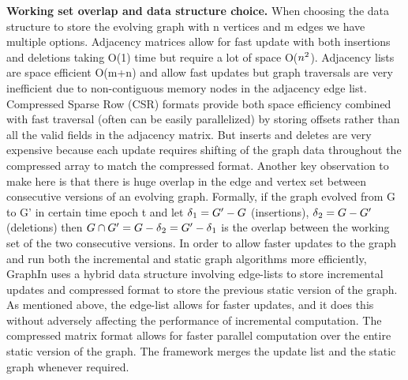 \textbf{Working set overlap and data structure choice.}
When choosing the data structure to store the evolving graph with n vertices and m edges we have multiple options. Adjacency matrices allow for fast update with both insertions and deletions taking O(1) time but require a lot of space O($n\textsuperscript{2}$). Adjacency lists are space efficient O(m+n) and allow fast updates but graph traversals are very inefficient due to non-contiguous memory nodes in the adjacency edge list. Compressed Sparse Row (CSR) formats provide both space efficiency combined with fast traversal (often can be easily parallelized) by storing offsets rather than all the valid fields in the adjacency matrix. But inserts and deletes are very expensive because each update requires shifting of the graph data throughout the compressed array to match the compressed format.
Another key observation to make here is that there is huge overlap in the edge and vertex set between consecutive versions of an evolving graph. Formally, if the graph evolved from G to G’ in certain time epoch t and let $\delta\textsubscript{1} = G' - G$ (insertions), $\delta\textsubscript{2} = G - G'$(deletions) then $G \cap G' = G - \delta\textsubscript{2}   = G' - \delta\textsubscript{1}$ is the overlap between the working set of the two consecutive versions.
In order to allow faster updates to the graph and run both the incremental and static graph algorithms more efficiently, GraphIn uses a hybrid data structure involving edge-lists to store incremental updates and compressed format to store the previous static version of the graph. As mentioned above, the edge-list allows for faster updates, and it does this without adversely affecting the performance of incremental computation. The compressed matrix format allows for faster parallel computation over the entire static version of the graph.  The framework merges the update list and the static graph whenever required.


